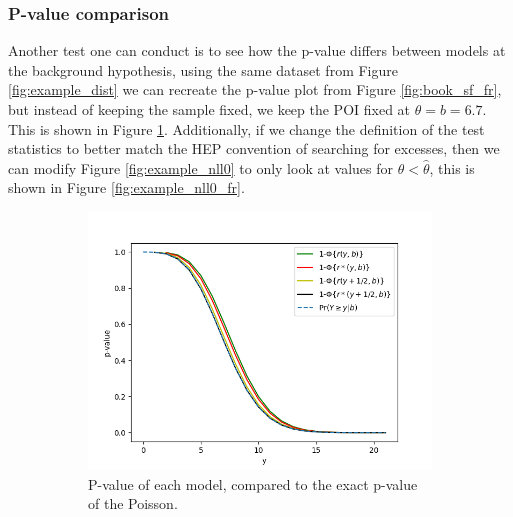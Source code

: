 \documentclass[14pt, a4paper]{article}  %
\begin{document}
\subsubsection{P-value comparison}
Another test one can conduct is to see how the p-value differs between models at the background hypothesis, using the same dataset from Figure \ref{fig:example_dist} we can recreate the p-value plot from Figure \ref{fig:book_sf_fr}, but instead of keeping the sample fixed, we keep the POI fixed at $\theta=b=6.7$. This is shown in Figure \ref{fig:example_pval}. Additionally, if we change the definition of the test statistics to better match the HEP convention of searching for excesses, then we can modify Figure \ref{fig:example_nll0} to only look at values for $\theta<\hat{\theta}$, this is shown in Figure \ref{fig:example_nll0_fr}.
\begin{figure}[!ht]
	\centering
	\begin{subfigure}[b]{0.49\textwidth}
        \centering
         \includegraphics[width=1\textwidth]{Poisson_approx/p_values.png}\caption{P-value of each model, compared to the exact p-value of the Poisson. }\label{fig:example_pval}
     \end{subfigure}
     \hfill
     \begin{subfigure}[b]{0.49\textwidth}
        \centering

\end{subfigure}
\end{figure}
\end{document}
